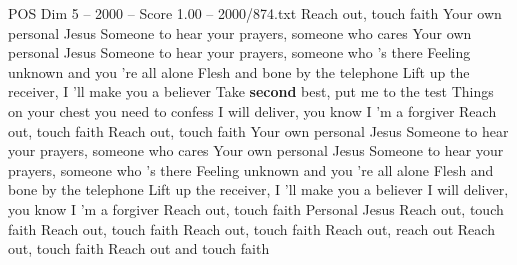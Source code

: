 \begin{textsample}{POS Dim 5 – 2000 – Score 1.00 – 2000/874.txt}  \label{ex:f5_pos_010}
Reach out, touch faith Your own personal Jesus Someone to hear your prayers, someone who cares Your own personal Jesus Someone to hear your prayers, someone who 's there Feeling unknown and you 're all alone Flesh and bone by the telephone Lift up the receiver, I 'll make you a believer Take \textbf{second} best, put me to the test Things on your chest you need to confess I will deliver, you know I 'm a forgiver Reach out, touch faith Reach out, touch faith Your own personal Jesus Someone to hear your prayers, someone who cares Your own personal Jesus Someone to hear your prayers, someone who 's there Feeling unknown and you 're all alone Flesh and bone by the telephone Lift up the receiver, I 'll make you a believer I will deliver, you know I 'm a forgiver Reach out, touch faith Personal Jesus Reach out, touch faith Reach out, touch faith Reach out, touch faith Reach out, reach out Reach out, touch faith Reach out and touch faith

\end{textsample}
